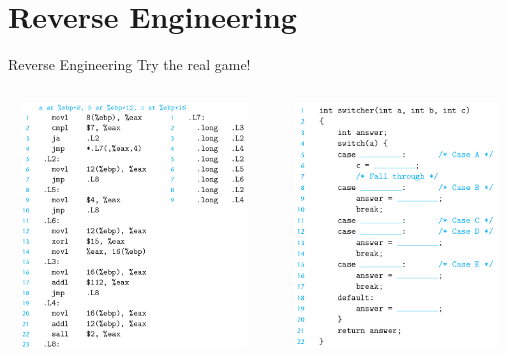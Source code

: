 \documentclass[UKenglish]{beamer}
\begin{document}
\section{Reverse Engineering}
\begin{frame}{Reverse Engineering}
  Try the real game!
  \vspace{1cm}
\begin{center}
  \begin{columns}[onlytextwidth]
    \begin{column}{0.45\textwidth}
          \begin{minipage}[c][0.56\textheight][c]{\linewidth} 
          \includegraphics[width = 1\textwidth, height=6.5cm]{switch_assembly.png}
          \end{minipage}
        \end{column}

        \begin{column}{0.45\textwidth}
          \begin{minipage}[c][0.56\textheight][c]{\linewidth} 
          \includegraphics[width = 1\textwidth, height=6.5cm]{switch_c.png}
          \end{minipage}
    \end{column}
  \end{columns}
\end{center}
\end{frame}
\end{document}
